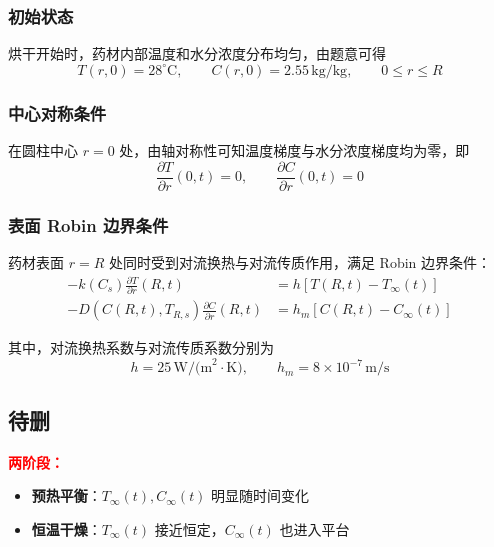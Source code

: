\documentclass[withoutpreface,bwprint]{cumcm_thesis}
\begin{document}
\subsubsection{初始状态}

烘干开始时，药材内部温度和水分浓度分布均匀，由题意可得
\begin{equation}
    T(r,0) = 28^\circ\text{C}, \qquad C(r,0) = 2.55 \, \text{kg/kg}, \qquad 0 \le r \le R
\end{equation}

\subsubsection{中心对称条件}

在圆柱中心 \(r=0\) 处，由轴对称性可知温度梯度与水分浓度梯度均为零，即
\begin{equation}
    \frac{\partial T}{\partial r}(0,t) = 0, \qquad \frac{\partial C}{\partial r}(0,t) = 0
\end{equation}

\subsubsection{表面 Robin 边界条件}

药材表面 \(r=R\) 处同时受到对流换热与对流传质作用，满足 Robin 边界条件：
\begin{align}
    -k(C_s) \frac{\partial T}{\partial r}(R,t) &= h \left[ T(R,t) - T_\infty(t) \right] \label{eq:bc_temp} \\
    -D(C(R,t), T_{R,s}) \frac{\partial C}{\partial r}(R,t) &= h_m \left[ C(R,t) - C_\infty(t) \right] \label{eq:bc_moisture}
\end{align}

其中，对流换热系数与对流传质系数分别为
\begin{equation}
    h = 25 \, \text{W/(m}^2\cdot\text{K)}, \qquad h_m = 8 \times 10^{-7} \, \text{m/s}
\end{equation}





\subsection{待删}
\textcolor{red}{\textbf{两阶段：}}
\begin{itemize}
    \item \textbf{预热平衡}：\(T_\infty(t), C_\infty(t)\) 明显随时间变化
    \item \textbf{恒温干燥}：\(T_\infty(t)\) 接近恒定，\(C_\infty(t)\) 也进入平台
\end{itemize}
\end{document}
